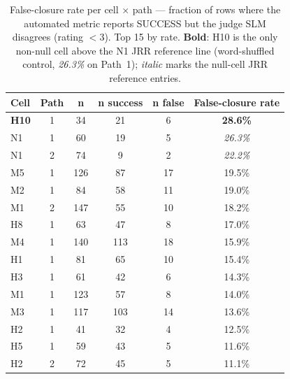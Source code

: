 \begin{table}[!htbp]
\centering
\caption{False-closure rate per cell $\times$ path --- fraction of rows where the automated metric reports SUCCESS but the judge SLM disagrees (rating $< 3$). Top 15 by rate. \textbf{Bold}: H10 is the only non-null cell above the N1 JRR reference line (word-shuffled control, \emph{26.3\%} on Path~1); \emph{italic} marks the null-cell JRR reference entries.}
\label{tab:false_closure}
\begin{tabular}{@{}lccccc@{}}
\toprule
Cell & Path & n & n success & n false & False-closure rate \\
\midrule
\textbf{H10} & 1 & 34 & 21 & 6 & \textbf{28.6\%} \\
N1 & 1 & 60 & 19 & 5 & \emph{26.3\%} \\
N1 & 2 & 74 & 9 & 2 & \emph{22.2\%} \\
M5 & 1 & 126 & 87 & 17 & 19.5\% \\
M2 & 1 & 84 & 58 & 11 & 19.0\% \\
M1 & 2 & 147 & 55 & 10 & 18.2\% \\
H8 & 1 & 63 & 47 & 8 & 17.0\% \\
M4 & 1 & 140 & 113 & 18 & 15.9\% \\
H1 & 1 & 81 & 65 & 10 & 15.4\% \\
H3 & 1 & 61 & 42 & 6 & 14.3\% \\
M1 & 1 & 123 & 57 & 8 & 14.0\% \\
M3 & 1 & 117 & 103 & 14 & 13.6\% \\
H2 & 1 & 41 & 32 & 4 & 12.5\% \\
H5 & 1 & 59 & 43 & 5 & 11.6\% \\
H2 & 2 & 72 & 45 & 5 & 11.1\% \\
\bottomrule
\end{tabular}
\end{table}
